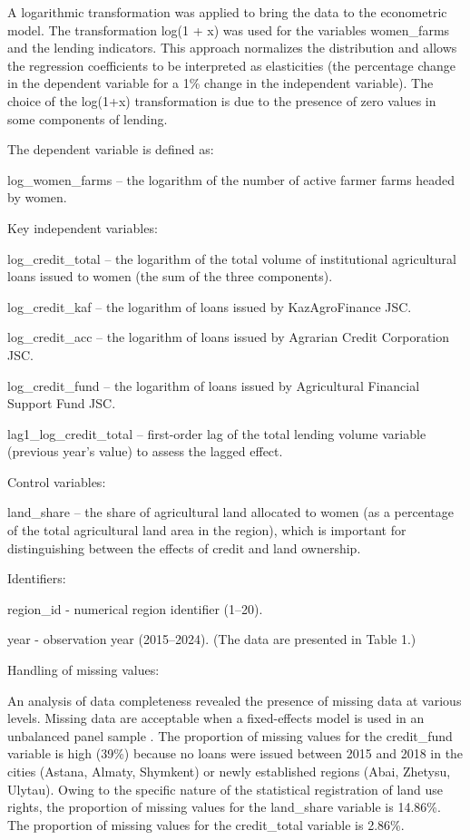 ﻿\documentclass[pdflatex,sn-mathphys-ay]{sn-jnl}
\begin{document}
A logarithmic transformation was applied to bring the data to the
econometric model. The transformation log(1 + x) was used for the
variables women\_farms and the lending indicators. This approach
normalizes the distribution and allows the regression coefficients to be
interpreted as elasticities (the percentage change in the dependent
variable for a 1\% change in the independent variable). The choice of
the log(1+x) transformation is due to the presence of zero values in
some components of lending.

The dependent variable is defined as:

log\_women\_farms -- the logarithm of the number of active farmer farms
headed by women.

Key independent variables:

log\_credit\_total -- the logarithm of the total volume of institutional
agricultural loans issued to women (the sum of the three components).

log\_credit\_kaf -- the logarithm of loans issued by KazAgroFinance JSC.

log\_credit\_acc -- the logarithm of loans issued by Agrarian Credit
Corporation JSC.

log\_credit\_fund -- the logarithm of loans issued by Agricultural
Financial Support Fund JSC.

lag1\_log\_credit\_total -- first-order lag of the total lending volume
variable (previous year's value) to assess the lagged effect.

Control variables:

land\_share -- the share of agricultural land allocated to women (as a
percentage of the total agricultural land area in the region), which is
important for distinguishing between the effects of credit and land
ownership.

Identifiers:

region\_id - numerical region identifier (1--20).

year - observation year (2015--2024). (The data are presented in Table 1.)

Handling of missing values:

An analysis of data completeness revealed the presence of missing data
at various levels. Missing data are acceptable when a fixed-effects
model is used in an unbalanced panel sample \citep{ref100}. The
proportion of missing values for the credit\_fund variable is high
(39\%) because no loans were issued between 2015 and 2018 in the cities
(Astana, Almaty, Shymkent) or newly established regions (Abai,
Zhetysu, Ulytau). Owing to the specific nature of the statistical
registration of land use rights, the proportion of missing values for
the land\_share variable is 14.86\%. The proportion of missing values
for the credit\_total variable is 2.86\%.
\end{document}
